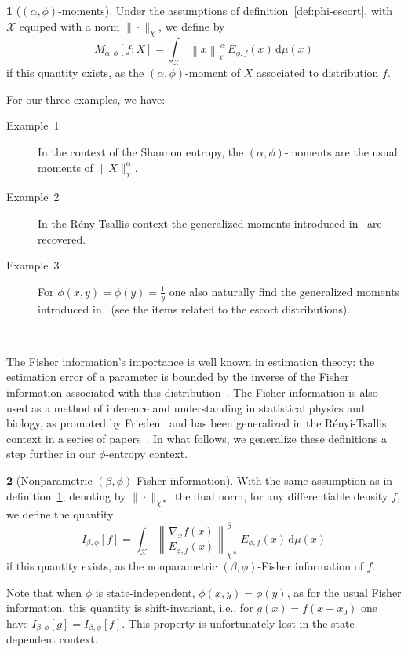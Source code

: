 \documentclass[english,sort&compress]{elsarticle}
\theoremstyle{definition}
\newtheorem{defn}{\protect\definitionname}
\theoremstyle{plain}
\theoremstyle{plain}
\providecommand{\definitionname}{Definition}
\def\dmu{\mathrm{d}\mu}
\def\X{\mathcal{X}}
\begin{document}
\begin{defn}[$(\alpha,\phi)$-moments]\label{def:phi-moment}
  Under the  assumptions of  definition~\ref{def:phi-escort}, with  $\X$ equiped
  with a norm $\| \cdot \|_\chi$, we define by
  \begin{equation}\label{eq:phi-moment}
  M_{\alpha,\phi}[f;X] = \int_\X \left\| x \right\|_\chi^{\: \alpha} \,
  E_{\phi,f}(x) \, \dmu(x)
  \end{equation}
  if this  quantity exists, as  the $(\alpha,\phi)$-moment of $X$  associated to
  distribution $f$.
\end{defn}
%
For our three examples, we have:
%
\begin{description}%
\item[Example~1]    In   the    context    of   the    Shannon   entropy,    the
  $(\alpha,\phi)$-moments are the usual moments of $\|X\|_\chi^\alpha$.
%
\item[Example~2]   In  the  R\'eny-Tsallis   context  the   generalized  moments
  introduced in~\cite{TsaMen98, MarNic00} are recovered.
%
\item[Example~3] For $\phi(x,y) = \phi(y) = \frac{1}{y}$ one also naturally find
  the generalized moments  introduced in~\cite{TsaMen98, MarNic00} (see the items
  related to the escort distributions).
\end{description}


\

The Fisher information's importance is well known in estimation theory: the estimation error of a parameter is bounded by the inverse of the Fisher information associated with this distribution~\cite{Kay93, CovTho06}. The Fisher information is also used as a method of inference and understanding in statistical physics and biology, as promoted by Frieden~\cite{Fri04} and has been generalized in the R\'enyi-Tsallis context in a series of
papers~\cite{Ham78, ChimPen00, CasChi02, LutYan05, LutLv12, Ber12:06_1,
 Ber12:06_2, Ber13}. In what follows, we generalize these definitions a step
further in our $\phi$-entropy context.


\begin{defn}[Nonparametric                                  $(\beta,\phi)$-Fisher
  information]\label{def:np-phi-Fisher}   With  the   same   assumption  as   in
  definition~\ref{def:phi-moment}, denoting  by $\|  \cdot \|_{\chi*}$  the dual
  norm, for any differentiable density $f$, we define the quantity
  \begin{equation}\label{eq:np-phi-Fisher}
    I_{\beta,\phi}[f] = \int_\X \left\| \frac{\nabla_x f(x)}{E_{\phi,f}(x)}
    \right\|_{\chi*}^\beta \, E_{\phi,f}(x) \, \dmu(x)
  \end{equation}
  if   this  quantity   exists,  as   the   nonparametric  $(\beta,\phi)$-Fisher
  information of $f$.
\end{defn}
%
Note that  when $\phi$ is state-independent,  $\phi(x,y) = \phi(y)$,  as for the
usual Fisher information,  this quantity is shift-invariant, i.e.,  for $g(x) =
f(x-x_0)$  one have  $I_{\beta,\phi}[g] =  I_{\beta,\phi}[f]$. This  property is
unfortunately lost in the state-dependent context.
\end{document}
